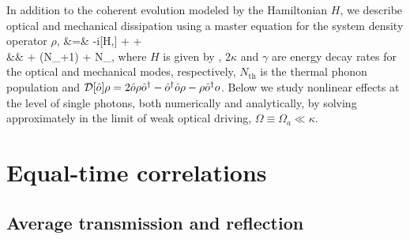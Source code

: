 In addition to the coherent evolution modeled  by the
Hamiltonian $H$, we describe optical and mechanical dissipation
using a master equation for the system density
operator $\rho$,
\bal
\label{eq:master_equation}
	\dot \rho &=& -i[H,\rho] + \kappa \DD[c_a]\rho +
	\kappa \DD[c_s]\rho \\
	&& \qquad + (N_{}+1) \DD[b]\rho +
	N_{}\DD[b\+]\rho,
\eal
where $H$ is  given by , $2\kappa$ and $\gamma$ are
energy decay rates for the optical and mechanical modes, respectively,
$N_{\text{th}}$ is the thermal phonon population and  $\mathcal{D}[\hat o] \rho =
2\hat o \rho \hat o^\dagger - \hat o^\dagger \hat o \rho - \rho \hat o^\dagger o$.
Below we study nonlinear effects at the level
of single photons, both numerically and analytically,
by solving 
approximately in the limit of weak
optical driving, $\Omega \equiv \Omega_a\ll
\kappa$.


\section{Equal-time correlations}
\label{sect:Averages}

 
\subsection{Average transmission and reflection}


